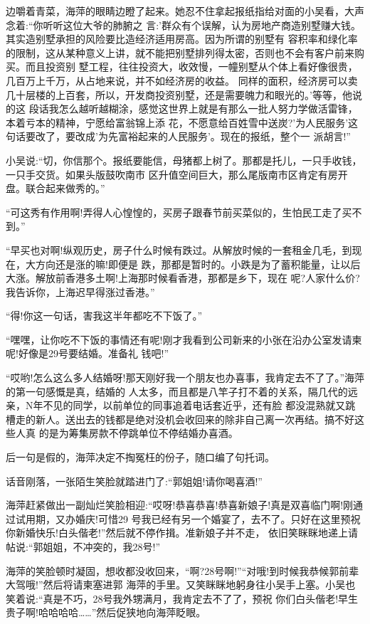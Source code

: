 \documentclass[11pt,a4paper,onecolumn]{article}
\begin{document}
边嚼着青菜，海萍的眼睛边瞪了起来。她忍不住拿起报纸指给对面的小吴看，大声念着:``你听听这位大爷的肺腑之
言:'群众有个误解，认为房地产商造别墅赚大钱。其实造别墅承担的风险要比造经济适用房高。因为所谓的别墅有
容积率和绿化率的限制，这从某种意义上讲，就不能把别墅排列得太密，否则也不会有客户前来购买。而且投资别
墅工程，往往投资大，收效慢，一幢别墅从个体上看好像很贵，几百万上千万，从占地来说，并不如经济房的收益。
同样的面积，经济房可以卖几十层楼的上百套，所以，开发商投资别墅，还是需要魄力和眼光的。'等等，他说的这
段话我怎么越听越糊涂，感觉这世界上就是有那么一批人努力学做活雷锋，本着亏本的精神，宁愿给富翁锦上添
花，不愿意给百姓雪中送炭?'为人民服务'这句话要改了，要改成'为先富裕起来的人民服务'。现在的报纸，整个一
派胡言!''

小吴说:``切，你信那个。报纸要能信，母猪都上树了。那都是托儿，一只手收钱，一只手交货。如果头版鼓吹南市
区升值空间巨大，那么尾版南市区肯定有房开盘。联合起来做秀的。''

``可这秀有作用啊!弄得人心惶惶的，买房子跟春节前买菜似的，生怕民工走了买不到。''

``早买也对啊!纵观历史，房子什么时候有跌过。从解放时候的一套租金几毛，到现在，大方向还是涨的嘛!即便是
跌，那都是暂时的。小跌是为了蓄积能量，让以后大涨。解放前香港多土啊!上海那时候看香港，那都是乡下，现在
呢?人家什么价?我告诉你，上海迟早得涨过香港。''

``得!你这一句话，害我这半年都吃不下饭了。''

``嘿嘿，让你吃不下饭的事情还有呢!刚才我看到公司新来的小张在沿办公室发请柬呢!好像是29号要结婚。准备礼
钱吧!''

``哎哟!怎么这么多人结婚呀!那天刚好我一个朋友也办喜事，我肯定去不了了。''海萍的第一句感慨是真，结婚的
人太多，而且都是八竿子打不着的关系，隔几代的远亲，N年不见的同学，以前单位的同事追着电话套近乎，还有脸
都没混熟就又跳槽走的新人。送出去的钱都是绝对没机会收回来的\myrule 除非自己离一次再结。搞不好这些人真
的是为筹集房款不停跳单位不停结婚办喜酒。

后一句是假的，海萍决定不掏冤枉的份子，随口编了句托词。

话音刚落，一张陌生笑脸就踏进门了:``郭姐姐!请你喝喜酒!''

海萍赶紧做出一副灿烂笑脸相迎:``哎呀!恭喜恭喜!恭喜新娘子!真是双喜临门啊!刚通过试用期，又办婚庆!可惜29
号我已经有另一个婚宴了，去不了。只好在这里预祝你新婚快乐!白头偕老!''然后就不停作揖。准新娘子并不走，
依旧笑眯眯地递上请帖说:``郭姐姐，不冲突的，我28号!''

海萍的笑脸顿时凝固，想收都没收回来，``啊?28号啊!''``对哦!到时候我恭候郭前辈大驾哦!''然后将请柬塞进郭
海萍的手里。又笑眯眯地躬身往小吴手上塞。小吴也笑着说:``真是不巧，28号我外甥满月，我肯定去不了了，预祝
你们白头偕老!早生贵子啊!哈哈哈哈……''然后促狭地向海萍眨眼。
\end{document}
